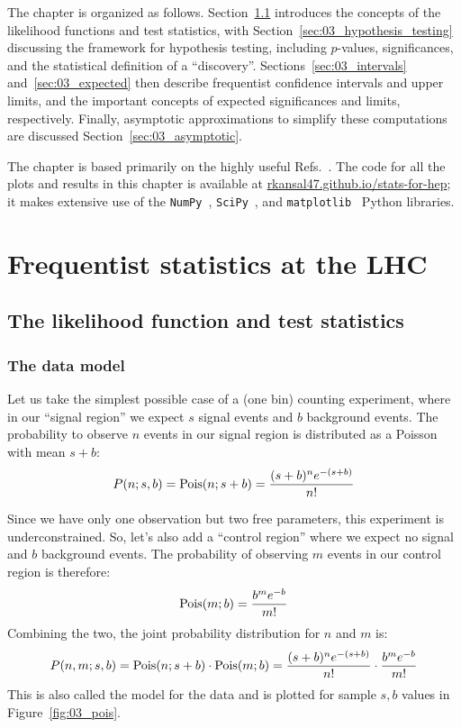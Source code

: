 The chapter is organized as follows.
Section~\ref{sec:03_likelihood} introduces the concepts of the likelihood functions and test statistics, with Section~\ref{sec:03_hypothesis_testing} discussing the framework for hypothesis testing, including $p$-values, significances, and the statistical definition of a ``discovery''.
Sections~\ref{sec:03_intervals} and~\ref{sec:03_expected} then describe frequentist confidence intervals and upper limits, and the important concepts of expected significances and limits, respectively.
Finally, asymptotic approximations to simplify these computations are discussed Section~\ref{sec:03_asymptotic}.

The chapter is based primarily on the highly useful Refs.~\cite{Cowan:2010js, Cranmer:2014lly}. 
The code for all the plots and results in this chapter is available at \href{https://rkansal47.github.io/stats-for-hep}{rkansal47.github.io/stats-for-hep}; it makes extensive use of the \texttt{NumPy}~\cite{harris2020array}, \texttt{SciPy}~\cite{2020SciPy-NMeth}, and \texttt{matplotlib}~\cite{Hunter:2007} Python libraries.


\section{Frequentist statistics at the LHC}

\subsection{The likelihood function and test statistics}
\label{sec:03_likelihood}

\subsubsection{The data model}
\label{sec:03_data_model}

Let us take the simplest possible case of a (one bin) counting experiment, where in our ``signal region'' we expect $s$ signal events and $b$ background events.
The probability to observe $n$ events in our signal region is distributed as a Poisson with mean $s+b$:
\begin{equation}
\label{eq:03_poisson}
P(n; s, b) = \mathrm{Pois}(n; s+b) = \frac{(s+b)^n e^{-(s+b)}}{n!}
\end{equation}

Since we have only one observation but two free parameters, this experiment is underconstrained.
So, let's also add a ``control region'' where we expect no signal and $b$ background events. 
The probability of observing $m$ events in our control region is therefore:
\begin{equation}
\label{eq:03_pois2}
\mathrm{Pois}(m; b) = \frac{b^m e^{-b}}{m!}
\end{equation}
Combining the two, the joint probability distribution for $n$ and $m$ is:
\begin{equation}
\label{eq:03_pois3}
P(n, m; s, b) = \mathrm{Pois}(n; s+b) \cdot \mathrm{Pois}(m; b) = \frac{(s+b)^n e^{-(s+b)}}{n!} \cdot \frac{b^m e^{-b}}{m!}
\end{equation}
This is also called the model for the data and is plotted for sample $s, b$ values in Figure~\ref{fig:03_pois}.

